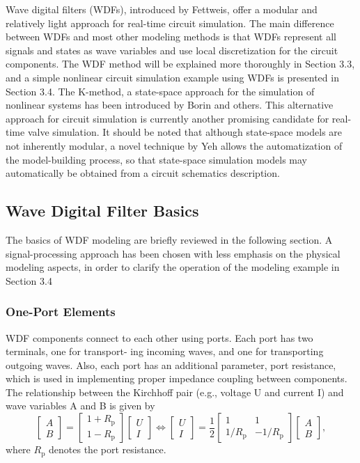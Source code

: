 \documentclass[10pt,a4paper,oneside]{article}
\begin{document}
Wave digital filters (WDFs), introduced by Fettweis, offer a modular and relatively light approach for real-time circuit simulation. The main difference between WDFs and most other modeling methods is that WDFs represent all signals and states as wave variables and use local discretization for the circuit components. The WDF method will be explained more thoroughly in Section 3.3, and a simple nonlinear circuit simulation example using WDFs is presented in Section 3.4. The K-method, a state-space approach for the simulation of nonlinear systems has been introduced by Borin and others. This alternative approach for circuit simulation is currently another promising candidate for real-time valve simulation. It should be noted that although state-space models are not inherently modular, a novel technique by Yeh allows the automatization of the model-building process, so that state-space simulation models may automatically be obtained from a circuit schematics description.
\subsection{Wave Digital Filter Basics}
The basics of WDF modeling are briefly reviewed in the following section. A signal-processing approach has been chosen with less emphasis on the physical modeling aspects, in order to clarify the operation of the modeling example in Section 3.4
\subsubsection{One-Port Elements}

WDF components connect to each other using ports. Each port has two terminals, one for transport- ing incoming waves, and one for transporting outgoing waves. Also, each port has an additional parameter, port resistance, which is used in implementing proper impedance coupling between components. The relationship between the Kirchhoff pair (e.g., voltage U and current I) and wave variables A and B is given by
\[
\left[ \begin{array}{l}{A} \\ {B}\end{array}\right]=\left[ \begin{array}{c}{1+R_{\mathrm{p}}} \\ {1-R_{\mathrm{p}}}\end{array}\right] \left[ \begin{array}{c}{U} \\ {I}\end{array}\right] \Leftrightarrow \left[ \begin{array}{c}{U} \\ {I}\end{array}\right]=\frac{1}{2} \left[ \begin{array}{cc}{1} & {1} \\ {1 / R_{\mathrm{p}}} & {-1 / R_{\mathrm{p}}}\end{array}\right] \left[ \begin{array}{c}{A} \\ {B}\end{array}\right],
\]
where $R_{\mathrm{p}}$ denotes the port resistance.
\end{document}

